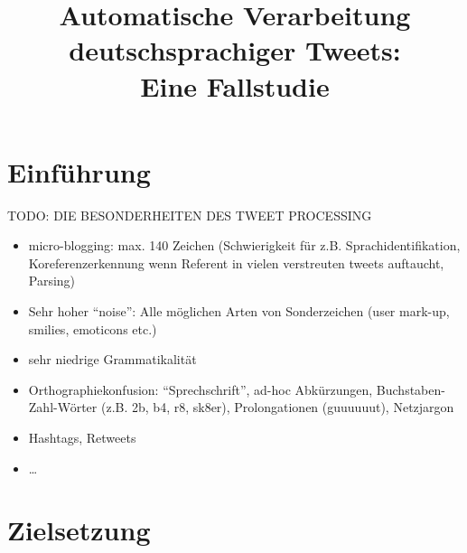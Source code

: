 \documentclass[11pt]{article}
\title{Automatische Verarbeitung deutschsprachiger Tweets:\\ Eine Fallstudie}
\author{}
\date{}
\begin{document}
\maketitle

\thispagestyle{empty}




\section{Einführung}

TODO: DIE BESONDERHEITEN DES TWEET PROCESSING
\begin{itemize}
  \item micro-blogging: max. 140 Zeichen (Schwierigkeit für z.B.
  Sprachidentifikation, Koreferenzerkennung wenn Referent in vielen verstreuten
  tweets auftaucht, Parsing)
  \item Sehr hoher ``noise'': Alle möglichen Arten von Sonderzeichen (user
  mark-up, smilies, emoticons etc.)
  \item sehr niedrige Grammatikalität
  \item Orthographiekonfusion: ``Sprechschrift'', ad-hoc Abkürzungen,
  Buchstaben-Zahl-Wörter (z.B. 2b, b4, r8, sk8er), Prolongationen (guuuuuut),
  Netzjargon
  \item Hashtags, Retweets
  \item \ldots
\end{itemize}

\section{Zielsetzung}
\end{document}
